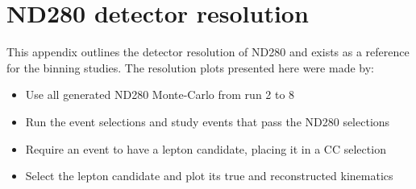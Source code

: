 \chapter{ND280 detector resolution}
\label{appendix:detector_resolution}
This appendix outlines the detector resolution of ND280 and exists as a reference for the binning studies. The resolution plots presented here were made by:
\begin{itemize}
	\item Use all generated ND280 Monte-Carlo from run 2 to 8
	\item Run the event selections and study events that pass the ND280 selections
	\item Require an event to have a lepton candidate, placing it in a CC selection
	\item Select the lepton candidate and plot its true and reconstructed kinematics
\end{itemize}

